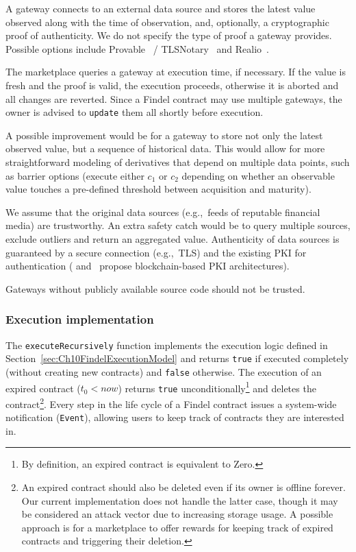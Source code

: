 A gateway connects to an external data source and stores the latest value observed along with the time of observation, and, optionally, a cryptographic proof of authenticity.
We do not specify the type of proof a gateway provides.
Possible options include Provable~\cite{Provable} / TLSNotary~\cite{TLSNotary} and Realio~\cite{Realitio}.

The marketplace queries a gateway at execution time, if necessary. 
If the value is fresh and the proof is valid, the execution proceeds, otherwise it is aborted and all changes are reverted.
Since a Findel contract may use multiple gateways, the owner is advised to \texttt{update} them all shortly before execution.

A possible improvement would be for a gateway to store not only the latest observed value, but a sequence of historical data.
This would allow for more straightforward modeling of derivatives that depend on multiple data points, such as barrier options (execute either \(c_1\) or \(c_2\) depending on whether an observable value touches a pre-defined threshold between acquisition and maturity).

We assume that the original data sources (e.g.,~feeds of reputable financial media) are trustworthy.
An extra safety catch would be to query multiple sources, exclude outliers and return an aggregated value.
Authenticity of data sources is guaranteed by a secure connection (e.g.,~TLS) and the existing PKI for authentication (\cite{Fromknecht2014} and~\cite{Lewison2016} propose blockchain-based PKI architectures).

Gateways without publicly available source code should not be trusted.


\subsubsection{Execution implementation} \label{sec:Ch10FindelExecutionImplementation}

The \texttt{executeRecursively} function implements the execution logic defined in Section~\ref{sec:Ch10FindelExecutionModel} and returns \texttt{true} if executed completely (without creating new contracts) and \texttt{false} otherwise.
The execution of an expired contract ($t_0 < now$) returns \texttt{true} unconditionally\footnote{By definition, an expired contract is equivalent to \(\mathrm{Zero}\).} and deletes the contract\footnote{An expired contract should also be deleted even if its owner is offline forever. Our current implementation does not handle the latter case, though it may be considered an attack vector due to increasing storage usage. A possible approach is for a marketplace to offer rewards for keeping track of expired contracts and triggering their deletion.}.
Every step in the life cycle of a Findel contract issues a system-wide notification (\texttt{Event}), allowing users to keep track of contracts they are interested in.

